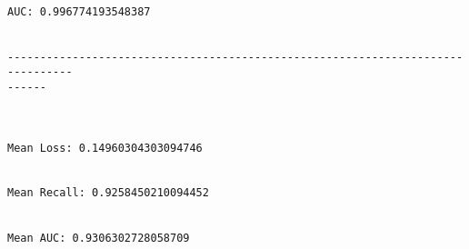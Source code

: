 \documentclass[11pt]{article}
\begin{document}
    \begin{center}
    \end{center}
    { \hspace*{\fill} \\}
    
    \begin{Verbatim}[commandchars=\\\{\}]
AUC: 0.996774193548387


--------------------------------------------------------------------------------
------



Mean Loss: 0.14960304303094746


Mean Recall: 0.9258450210094452


Mean AUC: 0.9306302728058709

    \end{Verbatim}


    
    
    
\end{document}
